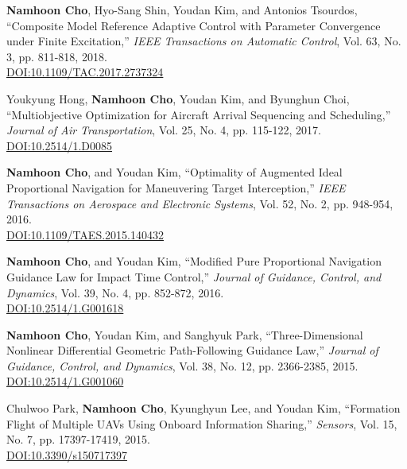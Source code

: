 \begin{enumerate}[itemsep=0.5em, label={[}J\arabic*{]}]
\item \textbf{Namhoon Cho}, Hyo-Sang Shin, Youdan Kim, and Antonios Tsourdos, ``Composite Model Reference Adaptive Control with Parameter Convergence under Finite Excitation,'' \textit{IEEE Transactions on Automatic Control}, Vol. 63, No. 3, pp. 811-818, 2018. \\
\href{https://doi.org/10.1109/TAC.2017.2737324}{DOI:10.1109/TAC.2017.2737324}

\item Youkyung Hong, \textbf{Namhoon Cho}, Youdan Kim, and Byunghun Choi, ``Multiobjective Optimization for Aircraft Arrival Sequencing and Scheduling,'' \textit{Journal of Air Transportation}, Vol. 25, No. 4, pp. 115-122, 2017. \\
\href{https://doi.org/10.2514/1.D0085}{DOI:10.2514/1.D0085}

\item \textbf{Namhoon Cho}, and Youdan Kim, ``Optimality of Augmented Ideal Proportional Navigation for Maneuvering Target Interception,'' \textit{IEEE Transactions on Aerospace and Electronic Systems}, Vol. 52, No. 2, pp. 948-954, 2016. \\
\href{https://doi.org/10.1109/TAES.2015.140432}{DOI:10.1109/TAES.2015.140432}

\item \textbf{Namhoon Cho}, and Youdan Kim, ``Modified Pure Proportional Navigation Guidance Law for Impact Time Control,'' \textit{Journal of Guidance, Control, and Dynamics}, Vol. 39, No. 4, pp. 852-872, 2016. \\
\href{https://doi.org/10.2514/1.G001618}{DOI:10.2514/1.G001618}

\item \textbf{Namhoon Cho}, Youdan Kim, and Sanghyuk Park, ``Three-Dimensional Nonlinear Differential Geometric Path-Following Guidance Law,'' \textit{Journal of Guidance, Control, and Dynamics}, Vol. 38, No. 12, pp. 2366-2385, 2015. \\
\href{https://doi.org/10.2514/1.G001060}{DOI:10.2514/1.G001060}

\item Chulwoo Park, \textbf{Namhoon Cho}, Kyunghyun Lee, and Youdan Kim, ``Formation Flight of Multiple UAVs Using Onboard Information Sharing,'' \textit{Sensors}, Vol. 15, No. 7, pp. 17397-17419, 2015. \\
\href{https://doi.org/10.3390/s150717397}{DOI:10.3390/s150717397}

\end{enumerate}
\vspace{0.5em}

